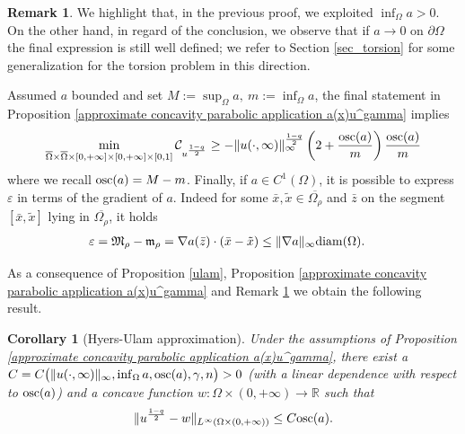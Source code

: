 \documentclass[11pt, reqno]{amsart}
\newtheorem{corollary}[lemma]{Corollary}
\theoremstyle{definition}
\newtheorem{remark}[lemma]{Remark}
\numberwithin{equation}{section}
\newcommand{\Omegabar}{\overline{\Omega}}
\newcommand{\R}{\mathbb{R}}
\newcommand{\diam}{{\rm diam}}
\newcommand{\osc}{{\rm osc}}
\def\eps{\varepsilon}
\def\norm#1{\|#1\|}
\begin{document}
\begin{remark}\label{rem_rough_estimate_osca}
We highlight that, in the previous proof, we exploited $\inf_{\Omega} a>0$. 
On the other hand, in regard of the conclusion, we observe that if $a\to 0$ on $\partial \Omega$ the final expression is still well defined; we refer to Section \ref{sec_torsion} for some generalization for the torsion problem in this direction.

Assumed $a$ bounded and set $M:= \sup_{\Omega} a,\ m:= \inf_{\Omega} a$, the final statement in Proposition \ref{approximate concavity parabolic application a(x)u^gamma} implies 
$$\min_{\Omegabar\times \Omegabar\times[0,+\infty]\times [0,+\infty]\times[0,1]}\mathcal{C}_{u^{\frac{1-q}{2}}} \geq 
- \norm{u(\cdot, \infty)}^{\frac{1-q}{2}}_\infty \left(2+ \frac{ \osc(a) }{m} \right) \frac{\osc(a)}{m}$$
where we recall $\osc(a)=M-m$.
Finally, if $a\in C^1(\Omega)$, it is possible to express $\varepsilon$ in terms of the gradient of $a$. Indeed for some $\bar{x},\tilde{x}\in\overline{ \Omega_\rho}$ and $\bar{z}$ on the segment $[\bar{x},\tilde{x}]$ lying in $\overline{\Omega_\rho}$, it holds
	\begin{align*}
		\eps = \mathfrak{M}_{\rho} - \mathfrak{m}_{\rho} &= \nabla a (\bar{z}) \cdot (\bar{x}-\tilde{x}) 
		 \leq \norm{\nabla a}_{\infty} \diam (\Omega).
	\end{align*}
\end{remark}

As a consequence of Proposition \ref{ulam}, Proposition \ref{approximate concavity parabolic application a(x)u^gamma} and Remark \ref{rem_rough_estimate_osca} we obtain the following result.
\begin{corollary}[Hyers-Ulam approximation]\label{corollario ulam}
Under the assumptions of Proposition \ref{approximate concavity parabolic application a(x)u^gamma}, there exist a $C=C\big(\norm{u(\cdot, \infty)}_{\infty}, \inf_{\Omega} a, \osc(a), \gamma, n \big)>0$ (with a linear dependence with respect to $\osc(a)$) and a concave function $w:\Omega\times(0,+\infty)\to \R$ such that
\[ \norm{u^{\frac{1-q}{2}}-w}_{L^\infty(\Omega\times(0,+\infty))}\leq C \osc(a).\]
\end{corollary}
\end{document}
